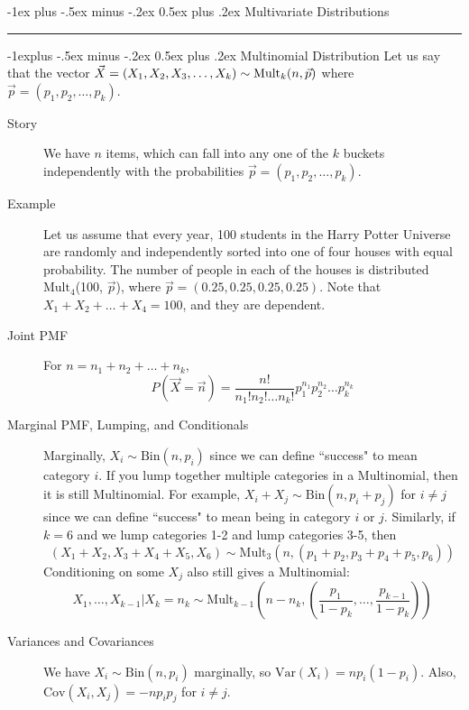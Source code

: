 \documentclass[10pt,landscape]{article}
\makeatletter
\newcommand{\var}{\textrm{Var}}
\newcommand{\cov}{\textrm{Cov}}
\newcommand{\Bin}{\textrm{Bin}}
\newcommand{\Mult}{\textrm{Mult}}
\renewcommand{\section}{\@startsection{section}{1}{0mm}%
                                {-1ex plus -.5ex minus -.2ex}%
                                {0.5ex plus .2ex}%
                                {\normalfont\large\bfseries}}
\renewcommand{\subsection}{\@startsection{subsection}{2}{0mm}%
                                {-1explus -.5ex minus -.2ex}%
                                {0.5ex plus .2ex}%
                                {\normalfont\normalsize\bfseries}}
\makeatother
\begin{document}
\begin{multicols*}{3}
									
	\section{Multivariate Distributions} \smallskip \hrule height 2pt \smallskip
									
									
	\subsection{Multinomial Distribution}
	Let us say that the vector $\vec{X} = (X_1, X_2, X_3, \dots, X_k) \sim \textnormal{Mult}_k(n, \vec{p})$  where $\vec{p} = (p_1, p_2, \dots, p_k)$.
	\begin{description}
		\item[Story]  We have $n$ items, which can fall into any one of the $k$ buckets independently with the probabilities $\vec{p} = (p_1, p_2, \dots, p_k)$.
		\item[Example]  Let us assume that every year, 100 students in the Harry Potter Universe are randomly and independently sorted into one of four houses with equal probability. The number of people in each of the houses is distributed $\Mult_4$(100, $\vec{p}$), where $\vec{p} = (0.25, 0.25, 0.25, 0.25)$.
		Note that $X_1 + X_2 + \dots + X_4 = 100$, and they are dependent.
		\item[Joint PMF]  For $n = n_1 + n_2 + \dots + n_k$,
		\[P(\vec{X} = \vec{n}) =  \frac{n!}{n_1!n_2!\dots n_k!}p_1^{n_1}p_2^{n_2}\dots p_k^{n_k}\]
		\item[Marginal PMF, Lumping, and Conditionals]
		Marginally, $X_i \sim \Bin(n,p_i)$ since we can define ``success" to mean category $i$. If you lump together multiple categories in a Multinomial, then it is still Multinomial. For example, $X_i + X_j \sim \Bin(n, p_i + p_j)$ for $i \neq j$ since we can define ``success" to mean being in category $i$ or $j$. Similarly, if $k=6$ and we lump categories 1-2 and lump categories 3-5, then
		\[ (X_1+X_2,X_3+X_4+X_5,X_6) \sim \Mult_3(n, (p_1+p_2, p_3 + p_4+p_5,p_6))\]
		Conditioning on some $X_j$ also still gives a Multinomial:
		\[X_1, \dots, X_{k-1} | X_k = n_k \sim \Mult_{k-1}\left(n - n_k, \left(\frac{p_1}{1 - p_k}, \dots, \frac{p_{k-1}}{1 - p_k}\right)\right)\]
		\item[Variances and Covariances]  We have  $X_i \sim \Bin(n, p_i)$ marginally, so $\var(X_i) = np_i(1-p_i)$. Also, $\cov(X_i, X_j) = -np_ip_j$ for $i \neq j$.
	\end{description}
									    
									

\end{multicols*}
\end{document}
